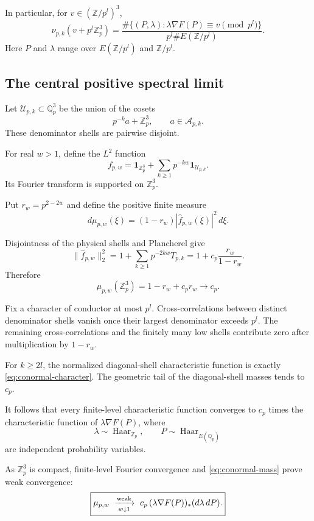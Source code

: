 \documentclass[11pt]{article}
\begin{document}
In particular, for
$v\in(\mathbb Z/p^l)^3$,
\[
\nu_{p,k}(v+p^l\mathbb Z_p^3)
=
\frac{
\#\{(P,\lambda):
\lambda\nabla F(P)\equiv v\pmod{p^l}\}
}{
p^l\#E(\mathbb Z/p^l)
}.
\]
Here $P$ and $\lambda$ range over
$E(\mathbb Z/p^l)$ and $\mathbb Z/p^l$.

\subsection{The central positive spectral limit}

Let $\mathcal U_{p,k}\subset\mathbb Q_p^3$
be the union of the cosets
\[
p^{-k}a+\mathbb Z_p^3,
\qquad a\in\mathcal A_{p,k}.
\]
These denominator shells are pairwise disjoint.

For real $w>1$, define the $L^2$ function
\[
f_{p,w}=
\mathbf1_{\mathbb Z_p^3}
+\sum_{k\ge1}p^{-kw}\mathbf1_{\mathcal U_{p,k}}.
\]
Its Fourier transform is supported on
$\mathbb Z_p^3$.

Put $r_w=p^{2-2w}$ and define the positive
finite measure
\[
d\mu_{p,w}(\xi)=
(1-r_w)|\widehat f_{p,w}(\xi)|^2\,d\xi.
\]

Disjointness of the physical shells and
Plancherel give
\[
\|\widehat f_{p,w}\|_2^2
=
1+\sum_{k\ge1}p^{-2kw}T_{p,k}
=
1+c_p\frac{r_w}{1-r_w}.
\]
Therefore
\begin{equation}\label{eq:conormal-mass}
\mu_{p,w}(\mathbb Z_p^3)
=1-r_w+c_pr_w
\longrightarrow c_p.
\end{equation}

Fix a character of conductor at most $p^l$.
Cross-correlations between distinct denominator
shells vanish once their largest denominator
exceeds $p^l$.
The remaining cross-correlations and the finitely
many low shells contribute zero after multiplication
by $1-r_w$.

For $k\ge2l$, the normalized diagonal-shell
characteristic function is exactly
\eqref{eq:conormal-character}.
The geometric tail of the diagonal-shell masses
tends to $c_p$.

It follows that every finite-level characteristic
function converges to
$c_p$ times the characteristic function of
$\lambda\nabla F(P)$, where
\[
\lambda\sim\operatorname{Haar}_{\mathbb Z_p},
\qquad
P\sim\operatorname{Haar}_{E(\mathbb Q_p)}
\]
are independent probability variables.

As $\mathbb Z_p^3$ is compact, finite-level
Fourier convergence and \eqref{eq:conormal-mass}
prove weak convergence:
\begin{equation}\label{eq:conormal-limit}
\boxed{
\mu_{p,w}\ \xrightarrow[w\downarrow1]{\rm weak}\
c_p\,(\lambda\nabla F(P))_*
(d\lambda\,dP).}
\end{equation}
\end{document}
